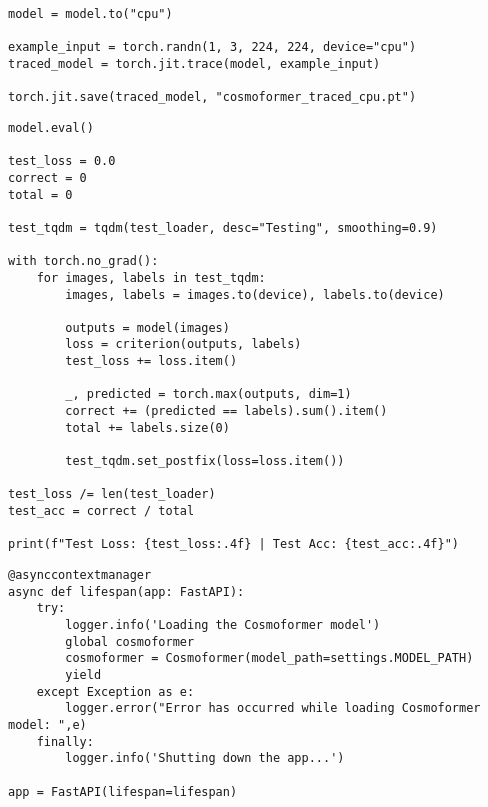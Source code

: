 \begin{samepage}
\begin{lstlisting}[style=mypython, caption={TorchScript model saving code example}, label={lst:model-save}]
model = model.to("cpu")

example_input = torch.randn(1, 3, 224, 224, device="cpu")
traced_model = torch.jit.trace(model, example_input)

torch.jit.save(traced_model, "cosmoformer_traced_cpu.pt")
\end{lstlisting}
\end{samepage}

\begin{samepage}
\begin{lstlisting}[style=mypython, caption={Test phase code example}, label={lst:loop-test}]
model.eval()

test_loss = 0.0
correct = 0
total = 0

test_tqdm = tqdm(test_loader, desc="Testing", smoothing=0.9)

with torch.no_grad():
    for images, labels in test_tqdm:
        images, labels = images.to(device), labels.to(device)
        
        outputs = model(images)
        loss = criterion(outputs, labels)
        test_loss += loss.item()
        
        _, predicted = torch.max(outputs, dim=1)
        correct += (predicted == labels).sum().item()
        total += labels.size(0)
        
        test_tqdm.set_postfix(loss=loss.item())

test_loss /= len(test_loader)
test_acc = correct / total

print(f"Test Loss: {test_loss:.4f} | Test Acc: {test_acc:.4f}")
\end{lstlisting}
\end{samepage}

\begin{samepage}
\begin{lstlisting}[style=mypython, caption={FastAPI initialization code example}, label={lst:be-life}]
@asynccontextmanager
async def lifespan(app: FastAPI):
    try:
        logger.info('Loading the Cosmoformer model')
        global cosmoformer
        cosmoformer = Cosmoformer(model_path=settings.MODEL_PATH)
        yield
    except Exception as e:
        logger.error("Error has occurred while loading Cosmoformer model: ",e)
    finally:
        logger.info('Shutting down the app...')

app = FastAPI(lifespan=lifespan)
\end{lstlisting}
\end{samepage}


